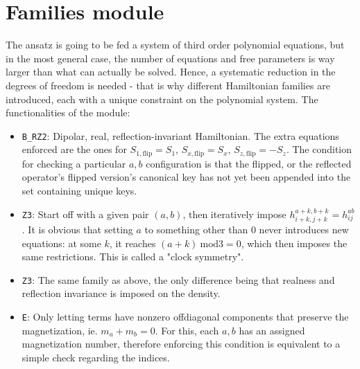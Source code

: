 \documentclass[a4paper, 11pt, twoside, onecolumn]{article}
\begin{document}
\section{Families module}
The ansatz is going to be fed a system of third order polynomial equations, but in the most general case, the number of equations and free parameters is way larger than what can actually be solved. Hence, a systematic reduction in the degrees of freedom is needed - that is why different Hamiltonian families are introduced, each with a unique constraint on the polynomial system.
The functionalities of the module:
\begin{itemize}
    \item \texttt{B_RZ2}: Dipolar, real, reflection-invariant Hamiltonian. The extra equations enforced are the ones for $S_{1,\mathrm{flip}}=S_1$, $S_{x,\mathrm{flip}}=S_x$, $S_{z,\mathrm{flip}}=-S_z$. The condition for checking a particular $a, b$ configuration is that the flipped, or the reflected operator's flipped version's canonical key has not yet been appended into the set containing unique keys.
    \item \texttt{Z3}: Start off with a given pair $(a, b)$, then iteratively impose $h_{i+k,j+k}^{a+k, b+k}=h_{ij}^{ab}$. It is obvious that setting $a$ to something other than 0 never introduces new equations: at some $k$, it reaches $(a+k) \ \mathrm{mod} 3=0$, which then imposes the same restrictions. This is called a "clock symmetry".
    \item \texttt{Z3}: The same family as above, the only difference being that realness and reflection invariance is imposed on the density.
    \item \texttt{E}: Only letting terms have nonzero offdiagonal components that preserve the magnetization, ie. $m_a+m_b=0$. For this, each $a, b$ has an assigned magnetization number, therefore enforcing this condition is equivalent to a simple check regarding the indices. 
\end{itemize}
\end{document}

